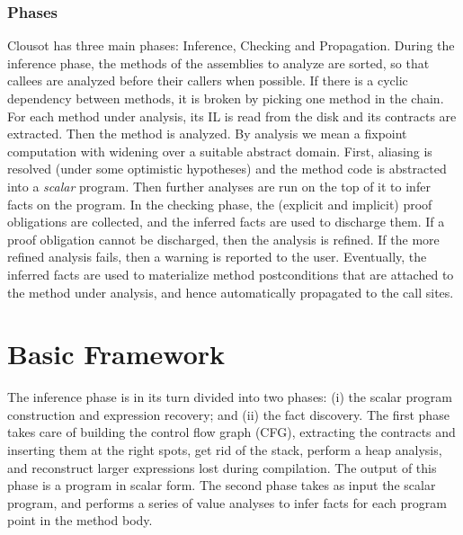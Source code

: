 \documentclass{llncs}
\begin{document}
\subsubsection{Phases} 
Clousot has three main phases: Inference, Checking and Propagation.
During the inference phase, the methods of the assemblies to analyze
are sorted, so that callees are analyzed before their callers when possible.  If
there is a cyclic dependency between methods, it is broken by picking
one method in the chain.  For each method under analysis, its IL is
read from the disk and its contracts are extracted.  Then the
method is analyzed.  By analysis we mean a fixpoint computation with
widening over a suitable abstract domain.  First, aliasing is resolved
(under some optimistic hypotheses) and the method code is abstracted into
a \emph{scalar} program.  Then further analyses are run on the top of
it to infer facts on the program.  In the checking phase, the
(explicit and implicit) proof obligations are collected, and the
inferred facts are used to discharge them.  If a proof obligation
cannot be discharged, then the analysis is refined.  If the more
refined analysis fails, then a warning is reported to the user.
Eventually, the inferred facts are used to materialize method
postconditions that are attached to the method under analysis, and
hence automatically propagated to the call sites.

\section{Basic Framework}
\label{sec:framework}
The inference phase is in its turn divided into two phases: (i) the
scalar program construction and expression recovery; and (ii) the fact
discovery.  The first phase takes care of building the control flow
graph (CFG), extracting the contracts and inserting them at the right
spots, get rid of the stack, perform a heap analysis, and reconstruct
larger expressions lost during compilation.  The output of
this phase is a program in scalar form.  The second phase takes as
input the scalar program, and performs a series of value analyses
to infer facts for each program point in the method body.
\end{document}
